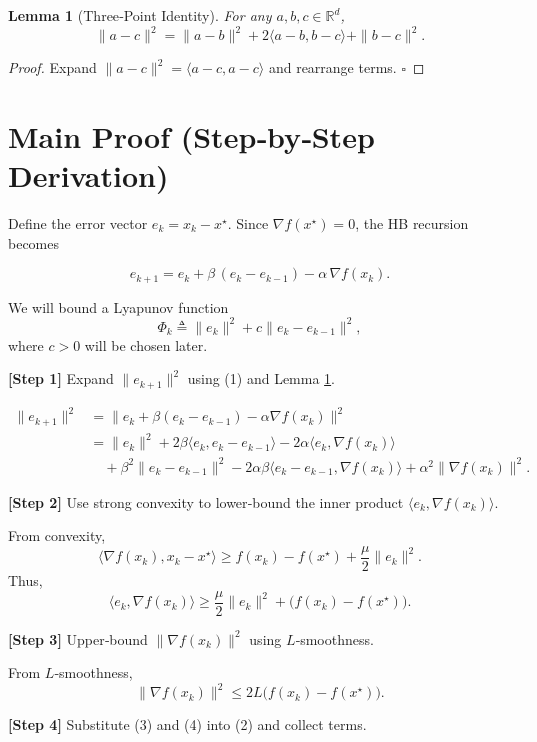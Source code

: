 \documentclass{article}
\newtheorem{lemma}{Lemma}
\begin{document}
\begin{lemma}[Three‑Point Identity]\label{lem:three}
For any $a,b,c\in\mathbb{R}^{d}$,
\[
\|a-c\|^{2}= \|a-b\|^{2}+2\langle a-b,b-c\rangle+\|b-c\|^{2}.
\]
\end{lemma}
\begin{proof}
Expand $\|a-c\|^{2}=\langle a-c,a-c\rangle$ and rearrange terms. \hfill $\square$
\end{proof}

\section*{Main Proof (Step‑by‑Step Derivation)}
Define the error vector $e_{k}=x_{k}-x^{\star}$.  
Since $\nabla f(x^{\star})=0$, the HB recursion becomes  

\[
e_{k+1}=e_{k}+\beta\,(e_{k}-e_{k-1})-\alpha\,\nabla f(x_{k}).\tag{1}
\]

We will bound a Lyapunov function  
\[
\Phi_{k}\triangleq \|e_{k}\|^{2}+c\|e_{k}-e_{k-1}\|^{2},
\]
where $c>0$ will be chosen later.

\bigskip
\noindent\textbf{[Step 1]} Expand $\|e_{k+1}\|^{2}$ using (1) and Lemma \ref{lem:three}.

\[
\begin{aligned}
\|e_{k+1}\|^{2}
&=\|e_{k}+\beta(e_{k}-e_{k-1})-\alpha\nabla f(x_{k})\|^{2}\\
&=\|e_{k}\|^{2}+2\beta\langle e_{k},e_{k}-e_{k-1}\rangle
   -2\alpha\langle e_{k},\nabla f(x_{k})\rangle\\
&\quad+\beta^{2}\|e_{k}-e_{k-1}\|^{2}
   -2\alpha\beta\langle e_{k}-e_{k-1},\nabla f(x_{k})\rangle
   +\alpha^{2}\|\nabla f(x_{k})\|^{2}. \tag{2}
\end{aligned}
\]

\noindent\textbf{[Step 2]} Use strong convexity to lower‑bound the inner product $\langle e_{k},\nabla f(x_{k})\rangle$.

From convexity,
\[
\langle \nabla f(x_{k}),x_{k}-x^{\star}\rangle\ge f(x_{k})-f(x^{\star})+\frac{\mu}{2}\|e_{k}\|^{2}.
\]
Thus,
\[
\langle e_{k},\nabla f(x_{k})\rangle\ge \frac{\mu}{2}\|e_{k}\|^{2}+ \bigl(f(x_{k})-f(x^{\star})\bigr).\tag{3}
\]

\noindent\textbf{[Step 3]} Upper‑bound $\|\nabla f(x_{k})\|^{2}$ using $L$‑smoothness.

From $L$‑smoothness,
\[
\|\nabla f(x_{k})\|^{2}\le 2L\bigl(f(x_{k})-f(x^{\star})\bigr). \tag{4}
\]

\noindent\textbf{[Step 4]} Substitute (3) and (4) into (2) and collect terms.
\end{document}
